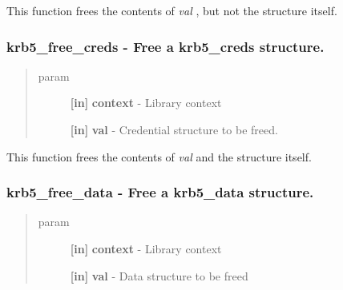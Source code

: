 \documentclass[letterpaper,10pt,english]{sphinxmanual}
\begin{document}
This function frees the contents of \emph{val} , but not the structure itself.


\subsubsection{krb5\_free\_creds -  Free a krb5\_creds structure.}
\label{appdev/refs/api/krb5_free_creds::doc}\label{appdev/refs/api/krb5_free_creds:krb5-free-creds-free-a-krb5-creds-structure}

\begin{fulllineitems}
\label{appdev/refs/api/krb5_free_creds:c.krb5_free_creds}
\end{fulllineitems}

\begin{quote}\begin{description}
\item[{param}] \leavevmode
\textbf{{[}in{]}} \textbf{context} - Library context

\textbf{{[}in{]}} \textbf{val} - Credential structure to be freed.

\end{description}\end{quote}

This function frees the contents of \emph{val} and the structure itself.


\subsubsection{krb5\_free\_data -  Free a krb5\_data structure.}
\label{appdev/refs/api/krb5_free_data:krb5-free-data-free-a-krb5-data-structure}\label{appdev/refs/api/krb5_free_data::doc}

\begin{fulllineitems}
\label{appdev/refs/api/krb5_free_data:c.krb5_free_data}
\end{fulllineitems}

\begin{quote}\begin{description}
\item[{param}] \leavevmode
\textbf{{[}in{]}} \textbf{context} - Library context

\textbf{{[}in{]}} \textbf{val} - Data structure to be freed

\end{description}\end{quote}
\end{document}
